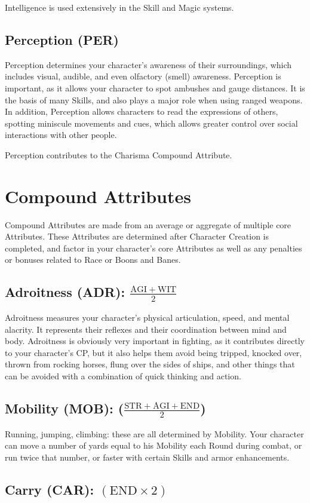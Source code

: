 \documentclass[oneside,11pt,english]{book}
\begin{document}
Intelligence is used extensively in the Skill and Magic systems. 
\subsection*{Perception (PER)}
Perception determines your character's awareness of their surroundings, which includes visual, audible, 
and even olfactory (smell) awareness. Perception is important, as it allows your character to spot 
ambushes and gauge distances. It is the basis of many Skills, and also plays a major role when using 
ranged weapons. In addition, Perception allows characters to read the expressions of others, spotting 
miniscule movements and cues, which allows greater control over social interactions with other people. 

 
Perception contributes to the Charisma Compound Attribute. 
\section{Compound Attributes}
Compound Attributes are made from an average or aggregate of multiple core Attributes. These 
Attributes are determined after Character Creation is completed, and factor in your character’s core 
Attributes as well as any penalties or bonuses related to Race or Boons and Banes. 
\subsection*{Adroitness (ADR): $\frac{\mathrm{AGI+WIT}}{2}$}
Adroitness measures your character’s physical articulation, speed, and mental alacrity. It represents their 
reflexes and their coordination between mind and body. Adroitness is obviously very important in 
fighting, as it contributes directly to your character’s CP, but it also helps them avoid being tripped, 
knocked over, thrown from rocking horses, flung over the sides of ships, and other things that can be 
avoided with a combination of quick thinking and action. 

 
\subsection*{Mobility (MOB): ($\frac{\mathrm{STR+AGI+END}}{2}$)}
Running, jumping, climbing: these are all determined by Mobility. Your character can move a number of 
yards equal to his Mobility each Round during combat, or run twice that number, or faster with certain 
Skills and armor enhancements. 
\subsection*{Carry (CAR): $(\mathrm{END} \times 2)$}
\end{document}
